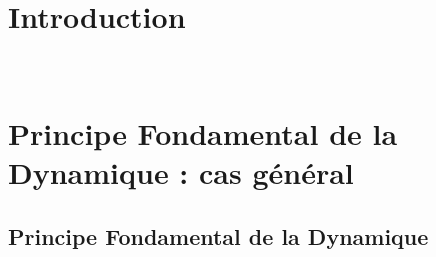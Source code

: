 \def\xxactivite{Cours}
\def\xxauteur{\textsl{Xavier Pessoles}}

\fichefalse
\proftrue
\tdfalse
\courstrue

\def\xxnumchapitre{Chapitre 1 \vspace{.2cm}}
\def\xxchapitre{\hspace{.12cm} Introduction à la dynamique du solide indéformable}

\def\xxcompetences{%
\textsl{%
\textbf{Savoirs et compétences :}\\
\begin{itemize}[label=\ding{112},font=\color{ocre}] 
\item \textit{Res1.C2} : principe fondamental de la dynamique;
\item \textit{Res1.C1.SF1} : proposer une démarche permettant la détermination de la loi de mouvement.
\end{itemize}
}}


\def\xxfigures{
\texttt{[image: newton]}%

 \textit{Isaac Newton -- 1643 - 1727.}
}%





\setlength{\columnseprule}{.1pt}

\vspace{2cm}
\pagestyle{fancy}
\thispagestyle{plain}



\section{Introduction}
\begin{obj} ~\\
\lipsum[1]
\end{obj}





\section[PFD : cas général]{Principe Fondamental de la Dynamique : cas général}

\subsection{Principe Fondamental de la Dynamique}

